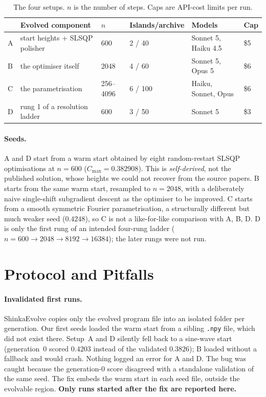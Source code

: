 \documentclass[11pt]{article}
\newcommand{\Cmax}{C_{\max}}
\begin{document}
\begin{table}[h]
\centering
\caption{The four setups. $n$ is the number of steps. Caps are API-cost limits
per run.}
\label{tab:setups}
\small
\begin{tabular}{llllll}
\toprule
 & Evolved component & $n$ & Islands/archive & Models & Cap \\
\midrule
A & start heights + SLSQP polisher & 600 & 2 / 40 & Sonnet 5, Haiku 4.5 & \$5 \\
B & the optimiser itself & 2048 & 4 / 60 & Sonnet 5, Opus 5 & \$6 \\
C & the parametrisation & 256--4096 & 6 / 100 & Haiku, Sonnet, Opus & \$6 \\
D & rung 1 of a resolution ladder & 600 & 3 / 50 & Sonnet 5 & \$3 \\
\bottomrule
\end{tabular}
\end{table}

\paragraph{Seeds.}
A and D start from a warm start obtained by eight random-restart SLSQP
optimisations at $n=600$ ($\Cmax=0.382908$). This is \emph{self-derived}, not
the published solution, whose heights we could not recover from the source
papers. B starts from the same warm start, resampled to $n=2048$, with a
deliberately naive single-shift subgradient descent as the optimiser to be
improved. C starts from a smooth symmetric Fourier parametrisation, a
structurally different but much weaker seed ($0.4248$), so C is not a
like-for-like comparison with A, B, D. D is only the first rung of an intended
four-rung ladder ($n=600\to2048\to8192\to16384$); the later rungs were not
run.

\section{Protocol and Pitfalls}

\paragraph{Invalidated first runs.}
ShinkaEvolve copies only the evolved program file into an isolated folder per
generation. Our first seeds loaded the warm start from a sibling \texttt{.npy}
file, which did not exist there. Setup~A and D silently fell back to a
sine-wave start (generation~0 scored $0.4203$ instead of the validated
$0.3826$); B loaded without a fallback and would crash. Nothing logged an error
for A and D. The bug was caught because the generation-0 score disagreed with a
standalone validation of the same seed. The fix embeds the warm start in each
seed file, outside the evolvable region. \textbf{Only runs started after the
fix are reported here.}
\end{document}
